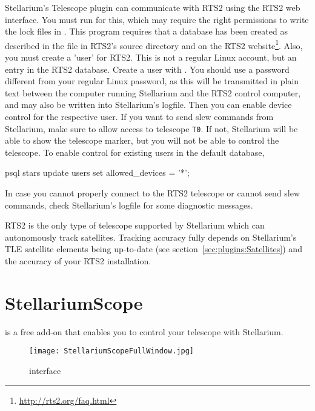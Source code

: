 Stellarium's Telescope plugin can communicate with RTS2 using the RTS2 web interface. You must run  for this, 
which may require the right permissions to write the lock files in . This program requires 
that a database has been created as described in the file  in RTS2's source directory and on the RTS2 website\footnote{\url{http://rts2.org/faq.html}}.   
Also, you must create a 'user' for RTS2. This is not a regular Linux account, but an entry in the RTS2 database. 
Create a user with . You should use a password different from your regular Linux password, 
as this will be transmitted in plain text between the computer running Stellarium and the RTS2 control computer, 
and may also be written into Stellarium's logfile. Then you can enable device control for the respective user. 
If you want to send slew commands from Stellarium, make sure to allow access to telescope \texttt{T0}. 
If not, Stellarium will be able to show the telescope marker, but you will not be able to control the telescope. 
To enable control for existing users in the default  database, 
\begin{commands}
psql stars
update users set allowed_devices = '*';
\end{commands}

In case you cannot properly connect to the RTS2 telescope or cannot send slew commands, check Stellarium's logfile  for some diagnostic messages.

RTS2 is the only type of telescope supported by Stellarium which can autonomously track satellites. 
Tracking accuracy fully depends on Stellarium's TLE satellite elements being up-to-date 
(see section~\ref{sec:plugins:Satellites}) and the accuracy of your RTS2 installation.

\newpage
\section{StellariumScope}
\label{sec:plugins:StellariumScope}
 is a free add-on that enables you to control your telescope with Stellarium. 

\begin{figure}[htp]
\begin{center}
\texttt{[image: StellariumScopeFullWindow.jpg]}
\end{center}
\caption{ interface}
\label{fig:StellariumScopeFullWindow}
\end{figure}


